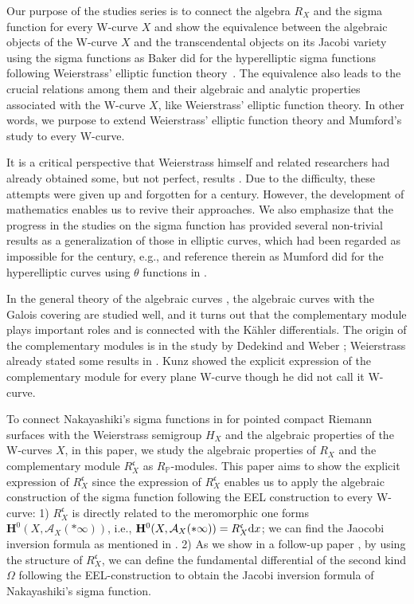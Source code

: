 \documentclass[pdftex]{sigma}
\def\PP{{\mathbb P}}
\def\bH{{\mathbf F}}
\def\bH{{\mathbf H}}
\def\cA{{\mathcal A}}
\def\fc{{\mathfrak c}}
\numberwithin{equation}{section}
\begin{document}
Our purpose of the studies series is to connect the algebra $R_X$ and the sigma function for every W-curve $X$ and show the equivalence between the algebraic objects of the W-curve $X$ and the transcendental objects on its Jacobi variety using the sigma functions as Baker did for the hyperelliptic sigma functions following Weierstrass' elliptic function theory~\cite{Baker97}.
The equivalence also leads to the crucial relations among them and their algebraic and analytic properties associated with the W-curve $X$, like Weierstrass' elliptic function theory.
In other words, we purpose to extend Weierstrass' elliptic function theory \cite{WeiWV} and Mumford's study \cite{Mum81,Mum84} to every W-curve.

It is a critical perspective that Weierstrass himself and related researchers had already obtained some, but not perfect, results \cite{Baker97,WeiWIV}.
Due to the difficulty, these attempts were given up and forgotten for a century.
However, the development of mathematics enables us to revive their approaches.
We also emphasize that the progress in the studies on the sigma function has provided several non-trivial results as a generalization of those in elliptic curves, which had been regarded as impossible for the century, e.g., \cite{BEL20,EEMOP07,EEMOP08, EEL00,FKMPA,MP08,MP14, Nak10b, Onishi18} and reference therein as Mumford did for the hyperelliptic curves using $\theta$ functions in \cite{Mum81,Mum84}.

In the general theory of the algebraic curves \cite{DedekindWeber,Kunz2004,Stichtenoth}, the algebraic curves with the Galois covering are studied well, and it turns out that the complementary module plays important roles and is connected with the K\"ahler differentials.
The origin of the complementary modules is in the study by Dedekind and Weber \cite{DedekindWeber}; Weierstrass already stated some results in \cite{WeiWIV}.
Kunz showed the explicit expression of the complementary module for every plane W-curve \cite[Theorem 15.1]{Kunz2004} though he did not call it W-curve.


To connect Nakayashiki's sigma functions in \cite{Nak16} for pointed compact Riemann surfaces with the Weierstrass semigroup $H_X$ and the algebraic properties of the W-curves $X$, in this paper, we study the algebraic properties of $R_X$ and the complementary module $R_X^\fc$ as $R_\PP$-modules.
This paper aims to show the explicit expression of $R_X^\fc$ since the expression of $R_X^\fc$ enables us to apply the algebraic construction of the sigma function following the EEL construction to every W-curve:
1) $R_X^\fc$ is directly related to the meromorphic one forms $\bH^0(X, \cA_X(*\infty))$, i.e., $\bH^0(X, \cA_X(*\infty))=R_X^\fc {\rm d} x$; we can find the Jaocobi inversion formula as mentioned in \cite{KM2020}.
2) As we show in a follow-up paper \cite{KMP2022b}, by using the structure of $R_X^\fc$, we can define the fundamental differential of the second kind $\Omega$ following the EEL-construction to obtain the Jacobi inversion formula of Nakayashiki's sigma function.
\end{document}

